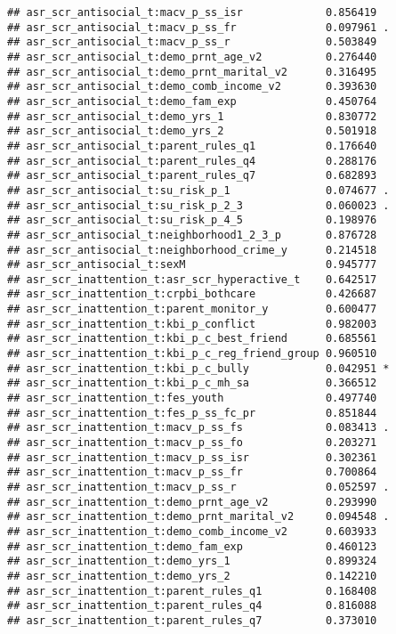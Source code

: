 \documentclass[
]{article}
\begin{document}
\begin{verbatim}
## asr_scr_antisocial_t:macv_p_ss_isr             0.856419    
## asr_scr_antisocial_t:macv_p_ss_fr              0.097961 .  
## asr_scr_antisocial_t:macv_p_ss_r               0.503849    
## asr_scr_antisocial_t:demo_prnt_age_v2          0.276440    
## asr_scr_antisocial_t:demo_prnt_marital_v2      0.316495    
## asr_scr_antisocial_t:demo_comb_income_v2       0.393630    
## asr_scr_antisocial_t:demo_fam_exp              0.450764    
## asr_scr_antisocial_t:demo_yrs_1                0.830772    
## asr_scr_antisocial_t:demo_yrs_2                0.501918    
## asr_scr_antisocial_t:parent_rules_q1           0.176640    
## asr_scr_antisocial_t:parent_rules_q4           0.288176    
## asr_scr_antisocial_t:parent_rules_q7           0.682893    
## asr_scr_antisocial_t:su_risk_p_1               0.074677 .  
## asr_scr_antisocial_t:su_risk_p_2_3             0.060023 .  
## asr_scr_antisocial_t:su_risk_p_4_5             0.198976    
## asr_scr_antisocial_t:neighborhood1_2_3_p       0.876728    
## asr_scr_antisocial_t:neighborhood_crime_y      0.214518    
## asr_scr_antisocial_t:sexM                      0.945777    
## asr_scr_inattention_t:asr_scr_hyperactive_t    0.642517    
## asr_scr_inattention_t:crpbi_bothcare           0.426687    
## asr_scr_inattention_t:parent_monitor_y         0.600477    
## asr_scr_inattention_t:kbi_p_conflict           0.982003    
## asr_scr_inattention_t:kbi_p_c_best_friend      0.685561    
## asr_scr_inattention_t:kbi_p_c_reg_friend_group 0.960510    
## asr_scr_inattention_t:kbi_p_c_bully            0.042951 *  
## asr_scr_inattention_t:kbi_p_c_mh_sa            0.366512    
## asr_scr_inattention_t:fes_youth                0.497740    
## asr_scr_inattention_t:fes_p_ss_fc_pr           0.851844    
## asr_scr_inattention_t:macv_p_ss_fs             0.083413 .  
## asr_scr_inattention_t:macv_p_ss_fo             0.203271    
## asr_scr_inattention_t:macv_p_ss_isr            0.302361    
## asr_scr_inattention_t:macv_p_ss_fr             0.700864    
## asr_scr_inattention_t:macv_p_ss_r              0.052597 .  
## asr_scr_inattention_t:demo_prnt_age_v2         0.293990    
## asr_scr_inattention_t:demo_prnt_marital_v2     0.094548 .  
## asr_scr_inattention_t:demo_comb_income_v2      0.603933    
## asr_scr_inattention_t:demo_fam_exp             0.460123    
## asr_scr_inattention_t:demo_yrs_1               0.899324    
## asr_scr_inattention_t:demo_yrs_2               0.142210    
## asr_scr_inattention_t:parent_rules_q1          0.168408    
## asr_scr_inattention_t:parent_rules_q4          0.816088    
## asr_scr_inattention_t:parent_rules_q7          0.373010    

\end{verbatim}
\end{document}
